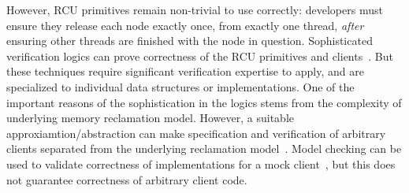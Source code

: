 However, RCU primitives remain non-trivial to use correctly: developers must ensure they release each node exactly once, from exactly one thread, \emph{after} ensuring other threads are finished with the node in question.
Sophisticated verification logics can prove correctness of the RCU primitives and clients~\cite{Gotsman:2013:VCM:2450268.2450289,fu2010reasoning,verrcu,Mandrykin:2016:TDV:3001219.3001297}.
But these techniques require significant verification expertise to apply, and are specialized to individual data structures or implementations.
One of the important reasons of the sophistication in the logics stems from the complexity of underlying memory reclamation model. However, a suitable approxiamtion/abstraction can make specification and verification of arbitrary clients separated from the underlying reclamation model~\cite{myr}.
Model checking can be used to validate correctness of implementations for a mock client~\cite{LiangMKM16,Desnoyers:2013:MSM:2506164.2506174,Kokologiannakis:2017:SMC:3092282.3092287,DBLP:conf/cav/AlglaveKT13}, but this does not guarantee correctness of arbitrary client code.

